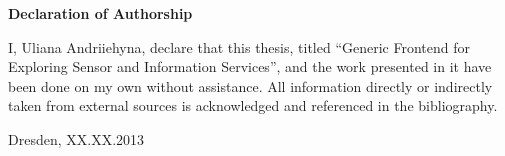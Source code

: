 \documentclass[a4paper, 12pt, twoside]{book}
\begin{document}

	
\newpage
\thispagestyle{empty}
\mbox{}

\newpage
\thispagestyle{empty}
\begingroup
  \vspace*{50 mm}
  {\huge \bf Declaration of Authorship}
  \vspace{10 mm}

  I, Uliana Andriiehyna, declare that this thesis, titled ``Generic Frontend for Exploring Sensor and Information Services'', and the work presented in it have been done on my own without assistance. All information directly or indirectly taken from external sources is acknowledged and referenced in the bibliography.

  \vspace{10 mm}

  Dresden, XX.XX.2013 \hspace{6.0 cm} \makebox[1.5in]{\hrulefill}
\endgroup


\newpage
\thispagestyle{empty}
\mbox{}
\clearpage

\tableofcontents

\newpage
\thispagestyle{empty}
\mbox{}
\clearpage

\setcounter{page}{1}
	
	
	
	
	
	
  \listoffigures
  \listoftables
  \printglossary[type=\acronymtype,style=long,title=List of Abbreviations,toctitle=List of Abbreviations]
  
\end{document}
